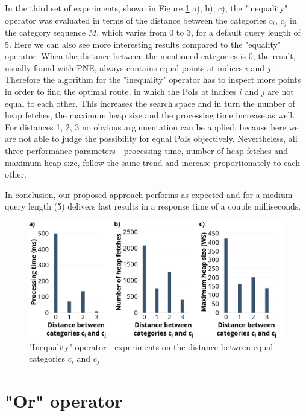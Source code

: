 In the third set of experiments, shown in Figure \ref{fig:neo_distance} a), b), c), the "inequality" operator was evaluated in terms of the  distance between the categories $c_i$, $c_j$ in the category sequence $M$, which varies from 0 to 3, for a default query length of 5.  
Here we can also see more interesting results compared to the "equality" operator. When the distance between the mentioned categories is 0, the result, usually found with PNE, always contains equal points at indices $i$ and $j$. Therefore the algorithm for the "inequality" operator has to inspect more points in order to find the optimal route, in which the PoIs at indices $i$ and $j$ are not equal to each other. This increases the search space and in turn the number of heap fetches, the maximum heap size and the processing time increase as well. For distances 1, 2, 3 no obvious argumentation can be applied, because here we are not able to judge the possibility for equal PoIs objectively.
Nevertheless, all three performance parameters - processing time, number of heap fetches and maximum heap size, follow the same trend and increase proportionately to each other.

In conclusion, our proposed approach performs as expected and for a medium query length (5) delivers fast results in a response time of a couple milliseconds.

\begin{figure}[H]
	\includegraphics[scale=0.33]{images/neo_distance_30.png}
	\centering
	\caption{"Inequality" operator - experiments on the distance between equal categories $c_i$ and $c_j$}
	\label{fig:neo_distance}
\end{figure}


\section{"Or" operator}
\label{sec:experimentsOr}

